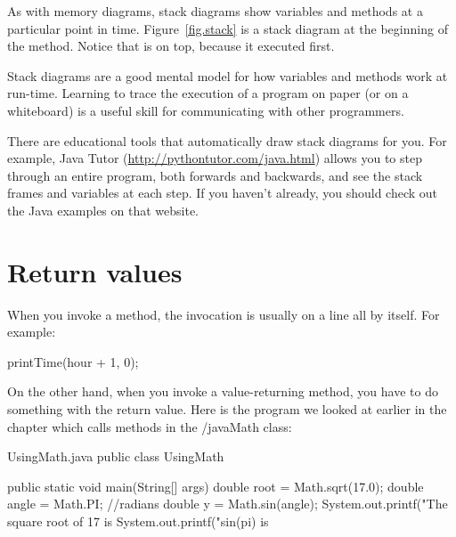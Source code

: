 As with memory diagrams, stack diagrams show variables and methods at a particular point in time.
Figure~\ref{fig.stack} is a stack diagram at the beginning of the  method.
Notice that  is on top, because it executed first.




Stack diagrams are a good mental model for how variables and methods work at run-time.
Learning to trace the execution of a program on paper (or on a whiteboard) is a useful skill for communicating with other programmers.

There are educational tools that automatically draw stack diagrams for you.
For example, Java Tutor (\url{http://pythontutor.com/java.html}) allows you to step through an entire program, both forwards and backwards, and see the stack frames and variables at each step.
If you haven't already, you should check out the Java examples on that website.



\section{Return values}


When you invoke a  method, the invocation is usually on a line all by itself.
For example:

\begin{code}
printTime(hour + 1, 0);
\end{code}

On the other hand, when you invoke a value-returning method, you have to do something with the return value.
%
Here is the program we looked at earlier in the chapter which calls methods in the /java{Math} class:
\begin{trinket} [220] {UsingMath.java}
public class UsingMath {

    public static void main(String[] args) {
       double root = Math.sqrt(17.0);
       double angle = Math.PI; //radians
       double y = Math.sin(angle);
       System.out.printf("The square root of 17 is %
       System.out.printf("sin(pi) is %
    }
}
\end{trinket}

